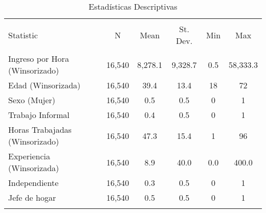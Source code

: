 \begin{table}[!htbp] \centering 
  \caption{Estadísticas Descriptivas} 
  \label{} 
\begin{tabular}{@{\extracolsep{5pt}}lccccc} 
\\[-1.8ex]\hline 
\hline \\[-1.8ex] 
Statistic & \multicolumn{1}{c}{N} & \multicolumn{1}{c}{Mean} & \multicolumn{1}{c}{St. Dev.} & \multicolumn{1}{c}{Min} & \multicolumn{1}{c}{Max} \\ 
\hline \\[-1.8ex] 
Ingreso por Hora (Winsorizado) & 16,540 & 8,278.1 & 9,328.7 & 0.5 & 58,333.3 \\ 
Edad (Winsorizada) & 16,540 & 39.4 & 13.4 & 18 & 72 \\ 
Sexo (Mujer) & 16,540 & 0.5 & 0.5 & 0 & 1 \\ 
Trabajo Informal & 16,540 & 0.4 & 0.5 & 0 & 1 \\ 
Horas Trabajadas (Winsorizado) & 16,540 & 47.3 & 15.4 & 1 & 96 \\ 
Experiencia (Winsorizada) & 16,540 & 8.9 & 40.0 & 0.0 & 400.0 \\ 
Independiente & 16,540 & 0.3 & 0.5 & 0 & 1 \\ 
Jefe de hogar & 16,540 & 0.5 & 0.5 & 0 & 1 \\ 
\hline \\[-1.8ex] 
\end{tabular} 
\end{table} 